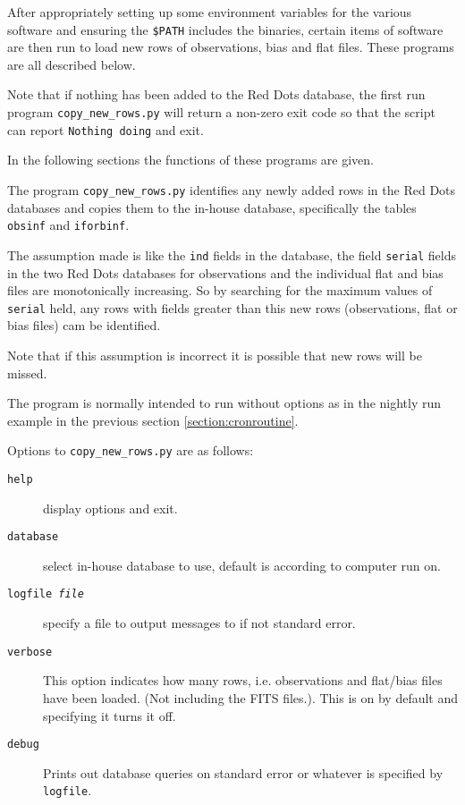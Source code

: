 After appropriately setting up some environment variables for the various
software and ensuring the \texttt{\$PATH} includes the binaries, certain items
of software are then run to load new rows of observations, bias and flat files.
These programs are all described below.

Note that if nothing has been added to the Red Dots database, the first run
program \texttt{copy\_new\_rows.py} will return a non-zero exit code so that the
script can report \texttt{Nothing doing} and exit.

In the following sections the functions of these programs are given.

\protect\label{section:copynewrows}

The program \texttt{copy\_new\_rows.py} identifies any newly added rows in the
Red Dots databases and copies them to the in-house database, specifically the
tables \texttt{obsinf} and \texttt{iforbinf}.

The assumption made is like the \texttt{ind} fields in the database, the field
\texttt{serial} fields in the two Red Dots databases for observations and the
individual flat and bias files are monotonically increasing. So by searching for
the maximum values of \texttt{serial} held, any rows with fields greater than
this new rows (observations, flat or bias files) cam be identified.

\bomb Note that if this assumption is incorrect it is possible that new rows
will be missed.

The program is normally intended to run without options as in the nightly run
example in the previous section \ref{section:cronroutine}.

Options to \texttt{copy\_new\_rows.py} are as follows:

\begin{description}
\item[\tt \dmin help] display options and exit.
\item[\tt \dmin database] select in-house database to use, default is according
to computer run on.
\item[\tt \dmin logfile \textit{file}] specify a file to output messages to if
not standard error.
\item[\tt \dmin verbose] This option indicates how many rows, i.e. observations and
flat/bias files have been loaded. (Not including the FITS files.). This is on by
default and specifying it turns it off.
\item[\tt \dmin debug] Prints out database queries on standard error or whatever
is specified by \texttt{\dmin logfile}.
\end{description}

